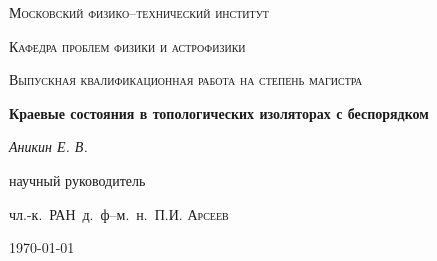 \begin{titlepage}
	\centering
	{\scshape\LARGE Московский физико--технический институт\par}
	{\scshape Кафедра проблем физики и астрофизики \par}
	\vspace{1cm}
	{\scshape\Large Выпускная квалификационная работа на степень магистра\par}
	\vspace{1.5cm}
	{\huge\bfseries Краевые состояния в топологических изоляторах с беспорядком
        \par}

	\vspace{2cm}
	{\Large\itshape Аникин Е. В.\par}
	\vfill
	научный руководитель\par
	чл.-к.~РАН~д.~ф--м.~н.~П.И. \textsc{Арсеев}

	\vfill

	{\large \today\par}
\end{titlepage}
